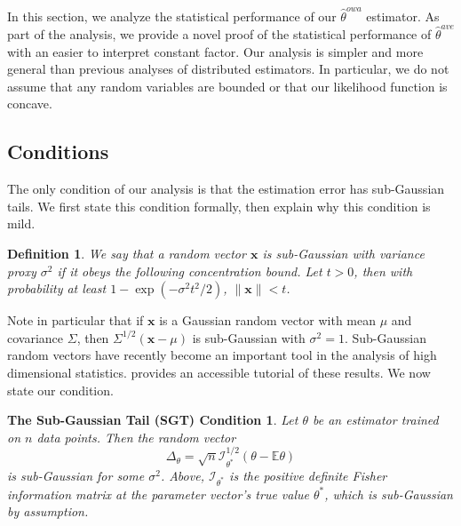 \documentclass[twoside]{article}
\newtheorem{defn}{Definition}
\newcommand{\E}{\mathbb{E}}
\newcommand{\x}{\mathbf{x}}
\newcommand{\w}{\theta}
\newcommand{\wowa}{\hat\w^{owa}}
\newcommand{\wave}{\hat\w^{ave}}
\newcommand{\wmle}{\hat\w^{mle}}
\newcommand{\wstar}{{\w^{*}}}
\newcommand{\I}{\mathcal I}
\newcommand{\ltwo}[1]{{\lVert {#1} \rVert}}
\newcommand{\ltwobig}[1]{{\left\lVert {#1} \right\rVert}}
\begin{document}
In this section, we analyze the statistical performance of our $\wowa$ estimator.
As part of the analysis, we provide a novel proof of the statistical performance of $\wave$ with an easier to interpret constant factor.
Our analysis is simpler and more general than previous analyses of distributed estimators.
In particular, we do not assume that any random variables are bounded
or that our likelihood function is concave.

\subsection{Conditions}

The only condition of our analysis is that the estimation error has sub-Gaussian tails.
We first state this condition formally,
then explain why this condition is mild.

\begin{defn}
We say that a random vector $\x$ is \emph{sub-Gaussian} with variance proxy $\sigma^2$ if it obeys the following concentration bound.
Let $t>0$, then with probability at least $1-\exp(-\sigma^2t^2/2)$,
$
\ltwo{\x} < t
$.
\end{defn}

Note in particular that if $\x$ is a Gaussian random vector with mean $\mu$ and covariance $\Sigma$,
then $\Sigma^{1/2}(\x-\mu)$ is sub-Gaussian with $\sigma^2=1$.
Sub-Gaussian random vectors have recently become an important tool in the analysis of high dimensional statistics.
\cite{vershynin2010introduction} provides an accessible tutorial of these results.
We now state our condition.

\newtheorem*{sgt}{The Sub-Gaussian Tail (SGT) Condition}
\begin{sgt}
Let $\theta$ be an estimator trained on $n$ data points.
Then the random vector
\begin{equation}
\Delta_\theta = \sqrt{n}{\I^{1/2}_\wstar(\theta-\E\theta)}
\end{equation}
is sub-Gaussian for some $\sigma^2$.
Above, $\I_\wstar$ is the positive definite Fisher information matrix at the parameter vector's true value $\wstar$,
which is sub-Gaussian by assumption.
\end{sgt}
\end{document}
